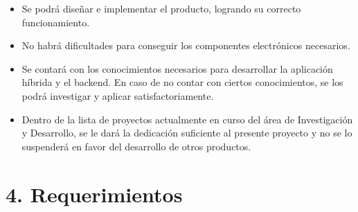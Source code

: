 \documentclass[
11pt, %
codirector, %
]{charter}
\begin{document}
\begin{itemize}
	\item Se podrá diseñar e implementar el producto, logrando su correcto funcionamiento.
	\item No habrá dificultades para conseguir los componentes electrónicos necesarios.
	\item Se contará con los conocimientos necesarios para desarrollar la aplicación híbrida y el backend. En caso de no contar con ciertos conocimientos, se los podrá investigar y aplicar satisfactoriamente.
	\item Dentro de la lista de proyectos actualmente en curso del área de Investigación y Desarrollo, se le dará la dedicación suficiente al presente proyecto y no se lo suspenderá en favor del desarrollo de otros productos.
\end{itemize}


\section{4. Requerimientos}
\label{sec:requerimientos}

\end{document}
